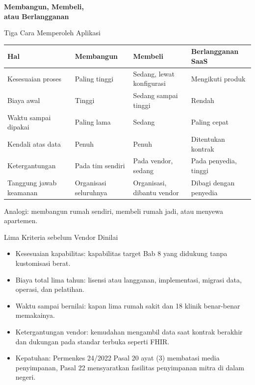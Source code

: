 \documentclass[aspectratio=169, table, 12pt]{beamer}
\begin{document}
\begin{frame}{\hfill}
  \centering
  \Huge{\textbf{Membangun, Membeli,\\atau Berlangganan}}
\end{frame}

\begin{frame}{{\Large Tiga Cara Memperoleh Aplikasi}}
  \footnotesize
  \begin{tabularx}{\textwidth}{L{3.1cm}YYY}
    \hline
    \textbf{Hal} & \textbf{Membangun} & \textbf{Membeli} & \textbf{Berlangganan SaaS} \\
    \hline
    Kesesuaian proses & Paling tinggi & Sedang, lewat konfigurasi & Mengikuti produk \\
    \hline
    Biaya awal & Tinggi & Sedang sampai tinggi & Rendah \\
    \hline
    Waktu sampai dipakai & Paling lama & Sedang & Paling cepat \\
    \hline
    Kendali atas data & Penuh & Penuh & Ditentukan kontrak \\
    \hline
    Ketergantungan & Pada tim sendiri & Pada vendor, sedang & Pada penyedia, tinggi \\
    \hline
    Tanggung jawab keamanan & Organisasi seluruhnya & Organisasi, dibantu vendor & Dibagi dengan penyedia \\
    \hline
  \end{tabularx}

  \vspace{6pt}
  \small Analogi: membangun rumah sendiri, membeli rumah jadi, atau menyewa apartemen.
\end{frame}

\begin{frame}{{\Large Lima Kriteria sebelum Vendor Dinilai}}
  \small
  \vspace{4pt}
  \begin{itemize}
    \item Kesesuaian kapabilitas: kapabilitas target Bab 8 yang didukung tanpa kustomisasi berat.
    \item Biaya total lima tahun: lisensi atau langganan, implementasi, migrasi data, operasi, dan
          pelatihan.
    \item Waktu sampai bernilai: kapan lima rumah sakit dan 18 klinik benar-benar memakainya.
    \item Ketergantungan vendor: kemudahan mengambil data saat kontrak berakhir dan dukungan pada
          standar terbuka seperti FHIR.
    \item Kepatuhan: Permenkes 24/2022 Pasal 20 ayat (3) membatasi media penyimpanan, Pasal 22
          mensyaratkan fasilitas penyimpanan mitra di dalam negeri.
  \end{itemize}
\end{frame}
\end{document}

